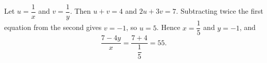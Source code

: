 Let $u=\dfrac1x$ and $v=\dfrac1y$. Then $u+v=4$ and $2u+3v=7$. Subtracting twice the first equation from the second gives $v=-1$, so $u=5$. Hence $x=\dfrac15$ and $y=-1$, and
\[\dfrac{7-4y}{x}=\dfrac{7+4}{\dfrac15}=\boxed{55}.\]
